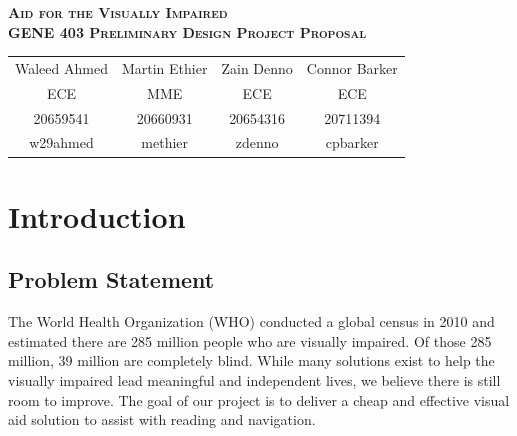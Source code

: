 \documentclass[a4paper,11pt]{article}
\begin{document}
\begin{titlingpage}
    \begin{center}
    
        {\Huge\bfseries\scshape%
            Aid for the Visually Impaired \\[0.5em]
        }
        {\Large\bfseries\scshape%
            GENE 403 Preliminary Design Project Proposal
        }

        \vspace{5em}
        
        \begin{tabular}{cccc}
            Waleed Ahmed & Martin Ethier & Zain Denno & Connor Barker \\
            ECE & MME & ECE & ECE \\
            20659541 & 20660931 & 20654316 & 20711394 \\
            w29ahmed & methier & zdenno & cpbarker
        \end{tabular}
        
        \vspace{5em}
        
        \tableofcontents
    \end{center}
\end{titlingpage}

\newpage

\section{Introduction}
\subsection{Problem Statement}
The World Health Organization (WHO) conducted a global census in 2010 and estimated there are 285 million people who are visually impaired. \cite{test} Of those 285 million, 39 million are completely blind. While many solutions exist to help the visually impaired lead meaningful and independent lives, we believe there is still room to improve. The goal of our project is to deliver a cheap and effective visual aid solution to assist with reading and navigation.
\end{document}
